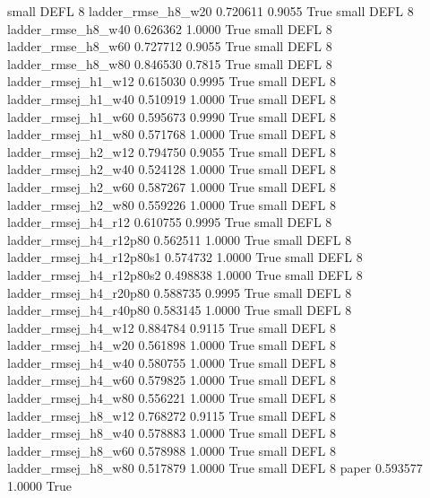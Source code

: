      small     DEFL                 8       ladder_rmse_h8_w20   0.720611      0.9055    True
     small     DEFL                 8       ladder_rmse_h8_w40   0.626362      1.0000    True
     small     DEFL                 8       ladder_rmse_h8_w60   0.727712      0.9055    True
     small     DEFL                 8       ladder_rmse_h8_w80   0.846530      0.7815    True
     small     DEFL                 8      ladder_rmsej_h1_w12   0.615030      0.9995    True
     small     DEFL                 8      ladder_rmsej_h1_w40   0.510919      1.0000    True
     small     DEFL                 8      ladder_rmsej_h1_w60   0.595673      0.9990    True
     small     DEFL                 8      ladder_rmsej_h1_w80   0.571768      1.0000    True
     small     DEFL                 8      ladder_rmsej_h2_w12   0.794750      0.9055    True
     small     DEFL                 8      ladder_rmsej_h2_w40   0.524128      1.0000    True
     small     DEFL                 8      ladder_rmsej_h2_w60   0.587267      1.0000    True
     small     DEFL                 8      ladder_rmsej_h2_w80   0.559226      1.0000    True
     small     DEFL                 8      ladder_rmsej_h4_r12   0.610755      0.9995    True
     small     DEFL                 8   ladder_rmsej_h4_r12p80   0.562511      1.0000    True
     small     DEFL                 8 ladder_rmsej_h4_r12p80s1   0.574732      1.0000    True
     small     DEFL                 8 ladder_rmsej_h4_r12p80s2   0.498838      1.0000    True
     small     DEFL                 8   ladder_rmsej_h4_r20p80   0.588735      0.9995    True
     small     DEFL                 8   ladder_rmsej_h4_r40p80   0.583145      1.0000    True
     small     DEFL                 8      ladder_rmsej_h4_w12   0.884784      0.9115    True
     small     DEFL                 8      ladder_rmsej_h4_w20   0.561898      1.0000    True
     small     DEFL                 8      ladder_rmsej_h4_w40   0.580755      1.0000    True
     small     DEFL                 8      ladder_rmsej_h4_w60   0.579825      1.0000    True
     small     DEFL                 8      ladder_rmsej_h4_w80   0.556221      1.0000    True
     small     DEFL                 8      ladder_rmsej_h8_w12   0.768272      0.9115    True
     small     DEFL                 8      ladder_rmsej_h8_w40   0.578883      1.0000    True
     small     DEFL                 8      ladder_rmsej_h8_w60   0.578988      1.0000    True
     small     DEFL                 8      ladder_rmsej_h8_w80   0.517879      1.0000    True
     small     DEFL                 8                    paper   0.593577      1.0000    True

